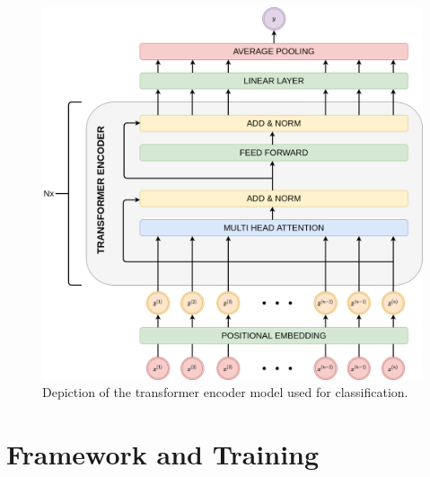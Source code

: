\begin{figure}[h]
	\centering
	\includegraphics[width=0.95\linewidth]{graphics/img/transformer_encoder_model.png}
	\caption{Depiction of the transformer encoder model used for classification.}
	\label{fig:transformer_model}
\end{figure}

\section{Framework and Training} \label{sec:methodology:freamework_and_training}

